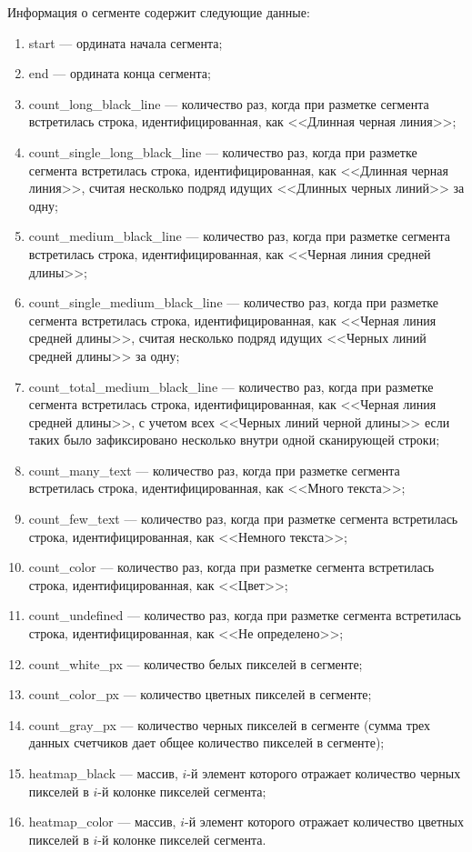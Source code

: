 Информация о сегменте содержит следующие данные:
\begin{enumerate}
    \item start --- ордината начала сегмента;
    \item end --- ордината конца сегмента;
    \item count\_long\_black\_line --- количество раз, когда при разметке сегмента встретилась строка, идентифицированная, как <<Длинная черная линия>>;
    \item count\_single\_long\_black\_line --- количество раз, когда при разметке сегмента встретилась строка, идентифицированная, как <<Длинная черная линия>>, считая несколько подряд идущих <<Длинных черных линий>> за одну;
    \item count\_medium\_black\_line --- количество раз, когда при разметке сегмента встретилась строка, идентифицированная, как <<Черная линия средней длины>>;
    \item count\_single\_medium\_black\_line --- количество раз, когда при разметке сегмента встретилась строка, идентифицированная, как <<Черная линия средней длины>>, считая несколько подряд идущих <<Черных линий средней длины>> за одну;
    \item count\_total\_medium\_black\_line --- количество раз, когда при разметке сегмента встретилась строка, идентифицированная, как <<Черная линия средней длины>>, с учетом всех <<Черных линий черной длины>> если таких было зафиксировано несколько внутри одной сканирующей строки;
    \item count\_many\_text --- количество раз, когда при разметке сегмента встретилась строка, идентифицированная, как <<Много текста>>;
    \item count\_few\_text --- количество раз, когда при разметке сегмента встретилась строка, идентифицированная, как <<Немного текста>>;
    \item count\_color --- количество раз, когда при разметке сегмента встретилась строка, идентифицированная, как <<Цвет>>;
    \item count\_undefined --- количество раз, когда при разметке сегмента встретилась строка, идентифицированная, как <<Не определено>>;
    \item count\_white\_px --- количество белых пикселей в сегменте;
    \item count\_color\_px --- количество цветных пикселей в сегменте;
    \item count\_gray\_px --- количество черных пикселей в сегменте (сумма трех данных счетчиков дает общее количество пикселей в сегменте);
    \item heatmap\_black --- массив, $i$-й элемент которого отражает количество черных пикселей в $i$-й колонке пикселей сегмента;
    \item heatmap\_color --- массив, $i$-й элемент которого отражает количество цветных пикселей в $i$-й колонке пикселей сегмента.
\end{enumerate}

